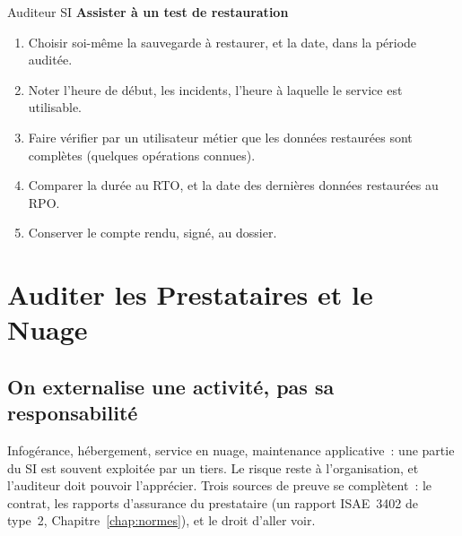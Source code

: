 \begin{boxmetier}{Auditeur SI}
\textbf{Assister à un test de restauration}
\begin{enumerate}
    \item Choisir soi-même la sauvegarde à restaurer, et la date, dans la
          période auditée.
    \item Noter l'heure de début, les incidents, l'heure à laquelle le
          service est utilisable.
    \item Faire vérifier par un utilisateur métier que les données
          restaurées sont complètes (quelques opérations connues).
    \item Comparer la durée au RTO, et la date des dernières données
          restaurées au RPO.
    \item Conserver le compte rendu, signé, au dossier.
\end{enumerate}
\end{boxmetier}

\section{Auditer les Prestataires et le Nuage}
\label{sec:c17-tiers}

\subsection{On externalise une activité, pas sa responsabilité}

Infogérance, hébergement, service en nuage, maintenance applicative~: une
partie du SI est souvent exploitée par un tiers. Le risque reste à
l'organisation, et l'auditeur doit pouvoir l'apprécier. Trois sources de
preuve se complètent~: le contrat, les rapports d'assurance du prestataire
(un rapport ISAE~3402 de type~2, Chapitre~\ref{chap:normes}), et le droit
d'aller voir.

